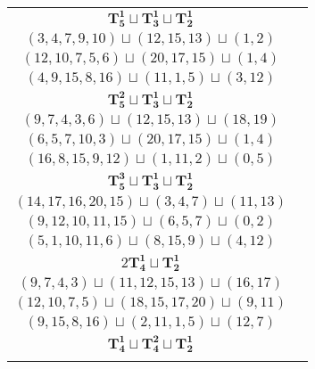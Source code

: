\documentclass{article}
\begin{document}
\begin{longtable}{|c|c|}
        \hline
        $\mathbf{T_{5}^{1}} \sqcup \mathbf{T_{3}^{1}} \sqcup \mathbf{T_{2}^{1}}$ & \begin{tabular}{c}
        $(2,4,6,9,12)\sqcup(13,14,15)\sqcup(18,19)$ \\ 
        $(3,4,7,9,10)\sqcup(12,15,13)\sqcup(1,2)$ \\ 
        $(12,10,7,5,6)\sqcup(20,17,15)\sqcup(1,4)$ \\ 
        $(4,9,15,8,16)\sqcup(11,1,5)\sqcup(3,12)$
        \end{tabular} \\ 
        \hline
        $\mathbf{T_{5}^{2}} \sqcup \mathbf{T_{3}^{1}} \sqcup \mathbf{T_{2}^{1}}$ & \begin{tabular}{c}
        $(12,9,6,4,11)\sqcup(17,16,15)\sqcup(0,1)$ \\ 
        $(9,7,4,3,6)\sqcup(12,15,13)\sqcup(18,19)$ \\ 
        $(6,5,7,10,3)\sqcup(20,17,15)\sqcup(1,4)$ \\ 
        $(16,8,15,9,12)\sqcup(1,11,2)\sqcup(0,5)$
        \end{tabular} \\ 
        \hline
        $\mathbf{T_{5}^{3}} \sqcup \mathbf{T_{3}^{1}} \sqcup \mathbf{T_{2}^{1}}$ & \begin{tabular}{c}
        $(13,15,16,18,14)\sqcup(9,6,7)\sqcup(2,4)$ \\ 
        $(14,17,16,20,15)\sqcup(3,4,7)\sqcup(11,13)$ \\ 
        $(9,12,10,11,15)\sqcup(6,5,7)\sqcup(0,2)$ \\ 
        $(5,1,10,11,6)\sqcup(8,15,9)\sqcup(4,12)$
        \end{tabular} \\ 
        \hline
        $2\mathbf{T_{4}^{1}} \sqcup \mathbf{T_{2}^{1}}$ & \begin{tabular}{c}
        $(4,6,9,12)\sqcup(16,15,14,13)\sqcup(19,20)$ \\ 
        $(9,7,4,3)\sqcup(11,12,15,13)\sqcup(16,17)$ \\ 
        $(12,10,7,5)\sqcup(18,15,17,20)\sqcup(9,11)$ \\ 
        $(9,15,8,16)\sqcup(2,11,1,5)\sqcup(12,7)$
        \end{tabular} \\ 
        \hline
        $\mathbf{T_{4}^{1}} \sqcup \mathbf{T_{4}^{2}} \sqcup \mathbf{T_{2}^{1}}$ & \begin{tabular}{c}
        $(11,9,6,7)\sqcup(16,15,13,14)\sqcup(1,4)$ \\ 

\end{tabular}
\end{longtable}
\end{document}

